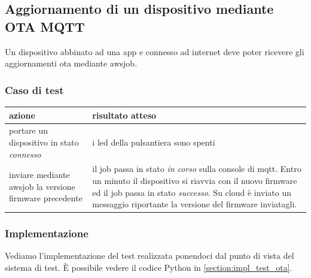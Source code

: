 \documentclass[12pt,a4paper,twoside,titlepage]{book}
\begin{document}
\subsection{Aggiornamento di un dispositivo mediante OTA MQTT}
\label{section:test_ota}

Un dispositivo abbinato ad una app e connesso ad internet deve poter ricevere gli
aggiornamenti \acrshort{ota} mediante \Gls{awsjob}.

\subsubsection{Caso di test}
\begin{center}
\begin{tabular}{| p{} | p{} |}
    \hline \textbf{azione} & \textbf{risultato atteso} \\
    \hline portare un dispositivo in stato \textit{connesso} & i \acrshort{led} della pulsantiera sono spenti \\
    \hline inviare mediante \Gls{awsjob} la versione \gls{firmware} precedente & il job passa in stato \textit{in corso} sulla console di \Gls{mqtt}. Entro un minuto il dispositivo si riavvia con il nuovo \gls{firmware} ed il job passa in stato \textit{successo}. Su cloud è inviato un messaggio riportante la versione del \gls{firmware} inviatagli. \\
    \hline
\end{tabular}
\end{center}

\subsubsection{Implementazione}
Vediamo l'implementazione del test realizzata ponendoci dal punto di vista del sistema di test. 
È possibile vedere il codice Python in \autoref{section:impl_test_ota}.
\end{document}
